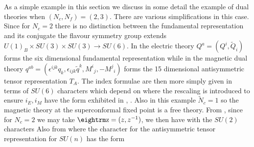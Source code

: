 As a simple example in this section we discuss in some detail the example of dual theories 
when  $(N_c,N_f)=(2,3)$. There are various simplifications in this case. Since for 
$N_c=2$ there is no distinction between the fundamental representation and its conjugate 
the flavour symmetry group extends $U(1)_B \times SU(3) \times SU(3) \to SU(6)$.  
In the electric theory $Q^a = (Q^i, {\tilde Q}_i)$
forms the six dimensional fundamental representation while in the magnetic dual theory
$q^{ab} = (\epsilon^{ijk}q_k, \epsilon_{ijk}{\tilde q}^k, M^i{\!}_j, -M^j{\!}_i)$ forms the 
15 dimensional antisymmetric tensor representation $T_A$. The index formulae are then
more simply given in terms of $SU(6)$ characters which depend on
\eqn{}
where the rescaling is introduced to ensure $i_E,i_M$ have the form exhibited in \imat, \igauge.
Also in this example ${\tilde N}_c =1$ so the magnetic theory at the superconformal fixed point
is a free theory. From \seiel, since for $N_c=2$ we may take $\z=(z,z^{-1})$, we then have
\eqn{}
with the $SU(2)$ characters
\eqn{}
Also from \seim
\eqn{}
where the character for the antisymmetric tensor representation for $SU(n)$ 
has the form
\eqn{}

